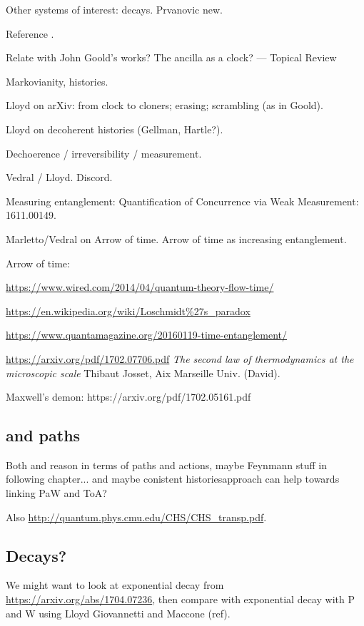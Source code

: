 Other systems of interest: decays. Prvanovic new.

Reference \cite{ConnesRovelliThermo}.

Relate with John Goold's works? The ancilla as a clock? --- Topical Review

Markovianity, histories.

Lloyd on arXiv: from clock to cloners; erasing; scrambling (as in Goold).

Lloyd on decoherent histories (Gellman, Hartle?).

Dechoerence / irreversibility / measurement.

Vedral / Lloyd. Discord.

Measuring entanglement: Quantification of Concurrence via Weak Measurement: 1611.00149.

Marletto/Vedral on Arrow of time. Arrow of time as increasing entanglement.

Arrow of time:

\url{https://www.wired.com/2014/04/quantum-theory-flow-time/}

\url{https://en.wikipedia.org/wiki/Loschmidt%27s_paradox}

\url{https://www.quantamagazine.org/20160119-time-entanglement/}

\url{https://arxiv.org/pdf/1702.07706.pdf} \textit{The second law of thermodynamics at the microscopic scale}
Thibaut Josset,
Aix Marseille Univ. (David).

Maxwell's demon: https://arxiv.org/pdf/1702.05161.pdf

\subsection{and paths}

Both \cite{YearsleyHalliwell_Clocks} and \cite{Gambini_PW}
reason in terms of paths and actions, maybe Feynmann stuff
in following chapter... and maybe conistent historiesapproach can help
towards linking PaW and ToA?

Also \url{http://quantum.phys.cmu.edu/CHS/CHS_transp.pdf}.

\subsection{Decays?}

We might want to look at exponential decay from \url{https://arxiv.org/abs/1704.07236},
then compare with exponential decay with P and W using Lloyd Giovannetti and Maccone (ref).

